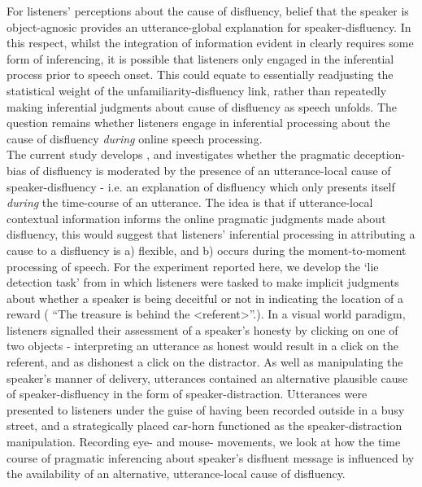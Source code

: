 \documentclass[man]{apa6}
\begin{document}
For listeners' perceptions about the cause of disfluency, belief that the speaker is object-agnosic provides an utterance-global explanation for speaker-disfluency. 
In this respect, whilst the integration of information evident in \citet{Arnold2007} clearly requires some form of inferencing, it is possible that listeners only engaged in the inferential process prior to speech onset. 
This could equate to essentially readjusting the statistical weight of the unfamiliarity-disfluency link, rather than repeatedly making inferential judgments about cause of disfluency as speech unfolds. 
The question remains whether listeners engage in inferential processing about the cause of disfluency \textit{during} online speech processing. \\

The current study develops \citet{Loy2016}, and investigates whether the pragmatic deception-bias of disfluency is moderated by the presence of an utterance-local cause of speaker-disfluency - i.e. an explanation of disfluency which only presents itself \textit{during} the time-course of an utterance. 
The idea is that if utterance-local contextual information informs the online pragmatic judgments made about disfluency, this would suggest that listeners' inferential processing in attributing a cause to a disfluency is a) flexible, and b) occurs during the moment-to-moment processing of speech. 
For the experiment reported here, we develop the `lie detection task' from \citet{Loy2016} in which listeners were tasked to make implicit judgments about whether a speaker is being deceitful or not in indicating the location of a reward ( ``The treasure is behind the \textless referent\textgreater ''.). 
In a visual world paradigm, listeners signalled their assessment of a speaker's honesty by clicking on one of two objects - interpreting an utterance as honest would result in a click on the referent, and as dishonest a click on the distractor. 
As well as manipulating the speaker's manner of delivery, utterances contained an alternative plausible cause of speaker-disfluency in the form of speaker-distraction. 
Utterances were presented to listeners under the guise of having been recorded outside in a busy street, and a strategically placed car-horn functioned as the speaker-distraction manipulation. 
Recording eye- and mouse- movements, we look at how the time course of pragmatic inferencing about speaker's disfluent message is influenced by the availability of an alternative, utterance-local cause of disfluency.
\end{document}
